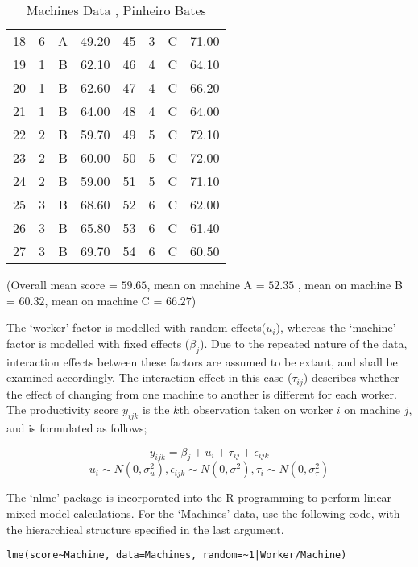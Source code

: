 \documentclass[main.tex]{subfiles}
\begin{document}
\begin{table}[h!]
\begin{center}
\begin{tabular}{|c|c|c|c||c|c|c|c|}
  18 & 6 & A & 49.20 &	  45 & 3 & C & 71.00 \\
  19 & 1 & B & 62.10 &	  46 & 4 & C & 64.10 \\
  20 & 1 & B & 62.60 &	  47 & 4 & C & 66.20 \\
  21 & 1 & B & 64.00 &	  48 & 4 & C & 64.00 \\
  22 & 2 & B & 59.70 &	  49 & 5 & C & 72.10 \\
  23 & 2 & B & 60.00 &	  50 & 5 & C & 72.00 \\
  24 & 2 & B & 59.00 &	  51 & 5 & C & 71.10 \\
  25 & 3 & B & 68.60 &	  52 & 6 & C & 62.00 \\
  26 & 3 & B & 65.80 &	  53 & 6 & C & 61.40 \\
  27 & 3 & B & 69.70 &	  54 & 6 & C & 60.50 \\

   \hline
\end{tabular}
\caption{Machines Data , Pinheiro Bates}
\end{center}
\end{table}
(Overall mean score = $59.65$, mean on machine A = $52.35$ , mean
on machine B = $60.32$, mean on machine C = $66.27$)
\newpage

The `worker' factor is modelled with random effects($u_{i}$),
whereas the `machine' factor is modelled with fixed effects
($\beta_{j}$). Due to the repeated nature of the data, interaction
effects between these factors are assumed to be extant, and shall
be examined accordingly. The interaction effect in this case
($\tau_{ij}$) describes whether the effect of changing from one
machine to another is different for each worker. The productivity
score $y_{ijk}$ is the $k$th observation taken on worker $i$ on
machine $j$, and is formulated
 as follows;

\begin{equation}
y_{ijk} = \beta_{j} + u_{i} + \tau_{ij} + \epsilon_{ijk}
\end{equation}
\begin{equation*}
u_{i} \sim N(0, \sigma^{2}_{u}), \epsilon_{ijk} \sim N(0,
\sigma^{2}), \tau_{i} \sim N(0, \sigma^{2}_{\tau})
\end{equation*}

The `nlme' package is incorporated into the R programming to
perform linear mixed model calculations. For the `Machines' data,
\citet{pb} use the following code, with the hierarchical structure
specified in the last argument.
\begin{verbatim}
lme(score~Machine, data=Machines, random=~1|Worker/Machine)
\end{verbatim}
\end{document}
